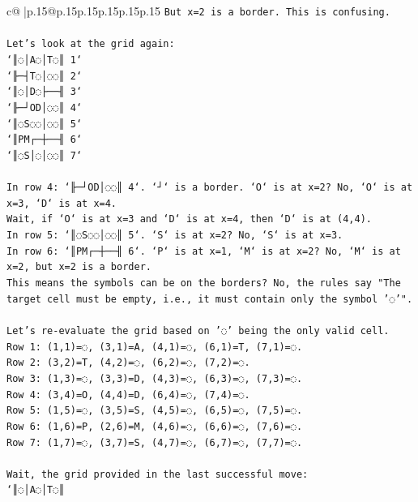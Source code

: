 \documentclass{article}
\begin{document}
{\begin{supertabular}{c@{$\;$}|p{.15\linewidth}@{}p{.15\linewidth}p{.15\linewidth}p{.15\linewidth}p{.15\linewidth}p{.15\linewidth}}
{{{\texttt{But x=2 is a border. This is confusing.} \\
\\ 
\texttt{Let's look at the grid again:} \\
\texttt{`║◌│A◌│T◌║ 1`} \\
\texttt{`╟─┤T◌│◌◌║ 2`} \\
\texttt{`║◌│D◌├──╢ 3`} \\
\texttt{`╟─┘OD│◌◌║ 4`} \\
\texttt{`║◌S◌◌│◌◌║ 5`} \\
\texttt{`║PM┌─┼──╢ 6`} \\
\texttt{`║◌S│◌│◌◌║ 7`} \\
\\ 
\texttt{In row 4: `╟─┘OD│◌◌║ 4`. `┘` is a border. `O` is at x=2? No, `O` is at x=3, `D` is at x=4.} \\
\texttt{Wait, if `O` is at x=3 and `D` is at x=4, then `D` is at (4,4).} \\
\texttt{In row 5: `║◌S◌◌│◌◌║ 5`. `S` is at x=2? No, `S` is at x=3.} \\
\texttt{In row 6: `║PM┌─┼──╢ 6`. `P` is at x=1, `M` is at x=2? No, `M` is at x=2, but x=2 is a border.} \\
\texttt{This means the symbols can be on the borders? No, the rules say "The target cell must be empty, i.e., it must contain only the symbol '◌'".} \\
\\ 
\texttt{Let's re{-}evaluate the grid based on '◌' being the only valid cell.} \\
\texttt{Row 1: (1,1)=◌, (3,1)=A, (4,1)=◌, (6,1)=T, (7,1)=◌.} \\
\texttt{Row 2: (3,2)=T, (4,2)=◌, (6,2)=◌, (7,2)=◌.} \\
\texttt{Row 3: (1,3)=◌, (3,3)=D, (4,3)=◌, (6,3)=◌, (7,3)=◌.} \\
\texttt{Row 4: (3,4)=O, (4,4)=D, (6,4)=◌, (7,4)=◌.} \\
\texttt{Row 5: (1,5)=◌, (3,5)=S, (4,5)=◌, (6,5)=◌, (7,5)=◌.} \\
\texttt{Row 6: (1,6)=P, (2,6)=M, (4,6)=◌, (6,6)=◌, (7,6)=◌.} \\
\texttt{Row 7: (1,7)=◌, (3,7)=S, (4,7)=◌, (6,7)=◌, (7,7)=◌.} \\
\\ 
\texttt{Wait, the grid provided in the last successful move:} \\
\texttt{`║◌│A◌│T◌║} \\
            }
        }
    }
     \\ \\


\end{supertabular}}
\end{document}
